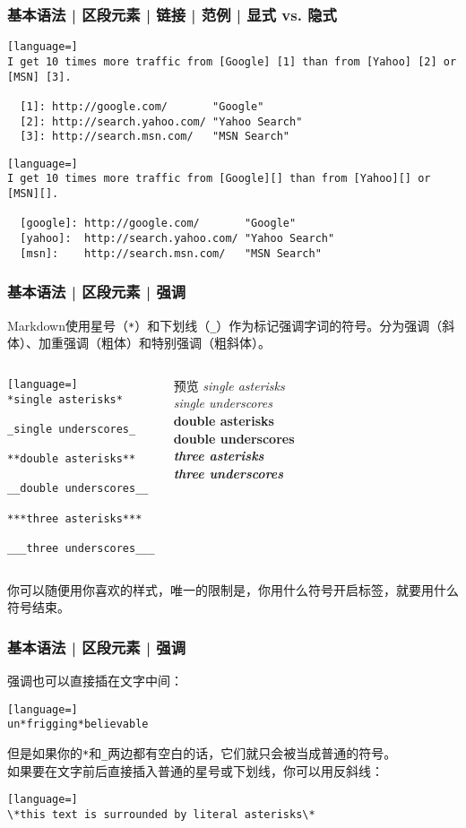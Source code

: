 \begin{frame}[fragile]
  \frametitle{基本语法 | 区段元素 | 链接 | 范例 | 显式 vs. 隐式}
\begin{lstlisting}[language=]
I get 10 times more traffic from [Google] [1] than from [Yahoo] [2] or [MSN] [3].

  [1]: http://google.com/       "Google"
  [2]: http://search.yahoo.com/ "Yahoo Search"
  [3]: http://search.msn.com/   "MSN Search"
\end{lstlisting}
\pause
\begin{lstlisting}[language=]
I get 10 times more traffic from [Google][] than from [Yahoo][] or [MSN][].

  [google]: http://google.com/       "Google"
  [yahoo]:  http://search.yahoo.com/ "Yahoo Search"
  [msn]:    http://search.msn.com/   "MSN Search"
\end{lstlisting}
\end{frame}

\begin{frame}[fragile]
  \frametitle{基本语法 | 区段元素 | \alert{强调}}
  Markdown使用星号（\verb|*|）和下划线（\verb|_|）作为标记强调字词的符号。分为强调（斜体）、加重强调（粗体）和特别强调（粗斜体）。
\begin{columns}
\begin{lstlisting}[language=]
*single asterisks*

_single underscores_

**double asterisks**

__double underscores__

***three asterisks***

___three underscores___
\end{lstlisting}
  \begin{block}{预览}
    \textit{single asterisks}\\
    \textit{single underscores}\\
    \textbf{double asterisks}\\
    \textbf{double underscores}\\
    \textbf{\textit{three asterisks}}\\
    \textbf{\textit{three underscores}}
  \end{block}
\end{columns}
\pause
你可以随便用你喜欢的样式，唯一的限制是，你用什么符号开启标签，就要用什么符号结束。
\end{frame}

\begin{frame}[fragile]
  \frametitle{基本语法 | 区段元素 | 强调}
  强调也可以直接插在文字中间：
\begin{lstlisting}[language=]
un*frigging*believable
\end{lstlisting}
\pause
  但是如果你的\verb|*|和\verb|_|两边都有空白的话，它们就只会被当成普通的符号。\\
  \vspace{1em}
\pause
  如果要在文字前后直接插入普通的星号或下划线，你可以用反斜线：
\begin{lstlisting}[language=]
\*this text is surrounded by literal asterisks\*
\end{lstlisting}
\end{frame}

